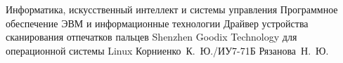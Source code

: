 \documentclass{bmstu}
\begin{document}
\makecourseworktitle
    {Информатика, искусственный интеллект и системы управления} %
    {Программное обеспечение ЭВМ и информационные технологии} %
    {Драйвер устройства сканирования отпечатков пальцев Shenzhen Goodix Technology для операционной системы Linux} %
    {Корниенко~К.~Ю./ИУ7-71Б} %
    {Рязанова~Н.~Ю.} %
    {} %

\maketableofcontents








\makebibliography


\end{document}
